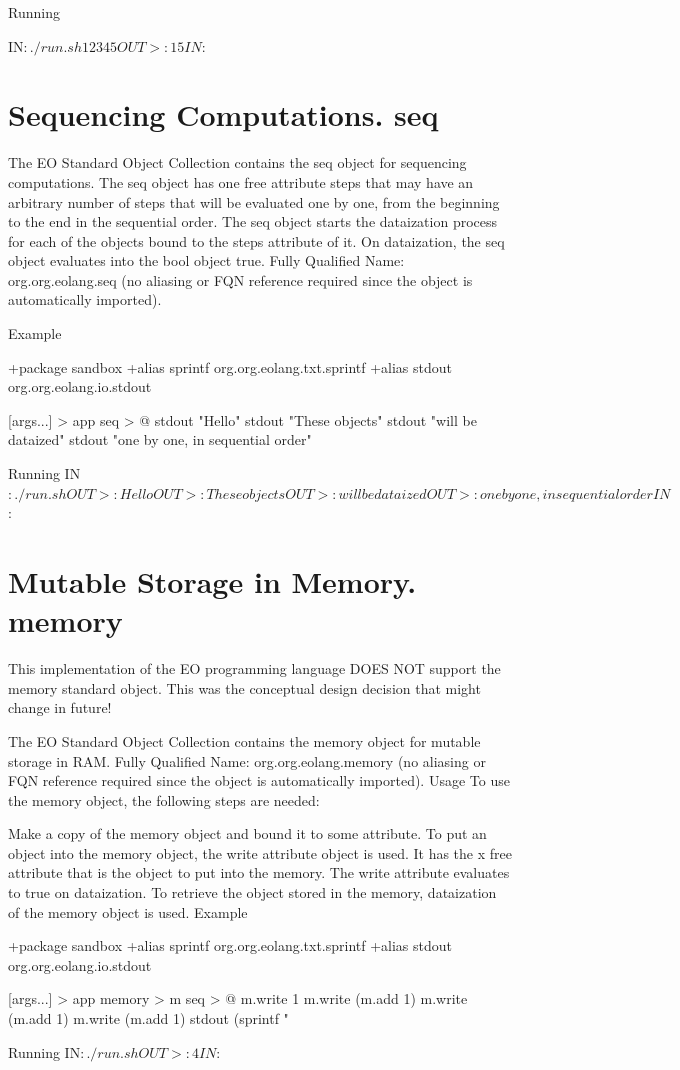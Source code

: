 \documentclass[12pt]{book}
\begin{document}
Running
\begin{ffcode}
IN$: ./run.sh 1 2 3 4 5
OUT>: 15
IN$: 
\end{ffcode}

\section{Sequencing Computations. seq}
The EO Standard Object Collection contains the seq object for sequencing computations.
The seq object has one free attribute steps that may have an arbitrary number of steps that will be evaluated one by one, from the beginning to the end in the sequential order.
The seq object starts the dataization process for each of the objects bound to the steps attribute of it.
On dataization, the seq object evaluates into the bool object true.
Fully Qualified Name: org.org.eolang.seq (no aliasing or FQN reference required since the object is automatically imported).

Example
\begin{ffcode}
+package sandbox
+alias sprintf org.org.eolang.txt.sprintf
+alias stdout org.org.eolang.io.stdout

[args...] > app
  seq > @
    stdout "Hello\n"
    stdout "These objects\n"
    stdout "will be dataized\n"
    stdout "one by one, in sequential order\n"

Running
IN$: ./run.sh
OUT>: Hello
OUT>: These objects
OUT>: will be dataized
OUT>: one by one, in sequential order
IN$: 
\end{ffcode}

\section{Mutable Storage in Memory. memory}
This implementation of the EO programming language DOES NOT support the memory standard object. This was the conceptual design decision that might change in future!

The EO Standard Object Collection contains the memory object for mutable storage in RAM.
Fully Qualified Name: org.org.eolang.memory (no aliasing or FQN reference required since the object is automatically imported).
Usage To use the memory object, the following steps are needed:

Make a copy of the memory object and bound it to some attribute.
To put an object into the memory object, the write attribute object is used. It has the x free attribute that is the object to put into the memory. The write attribute evaluates to true on dataization.
To retrieve the object stored in the memory, dataization of the memory object is used.
Example
\begin{ffcode}
+package sandbox
+alias sprintf org.org.eolang.txt.sprintf
+alias stdout org.org.eolang.io.stdout

[args...] > app
  memory > m
  seq > @
    m.write 1
    m.write (m.add 1)
    m.write (m.add 1)
    m.write (m.add 1)
    stdout (sprintf "%

Running
IN$: ./run.sh
OUT>: 4
IN$: 
\end{ffcode}
\end{document}

